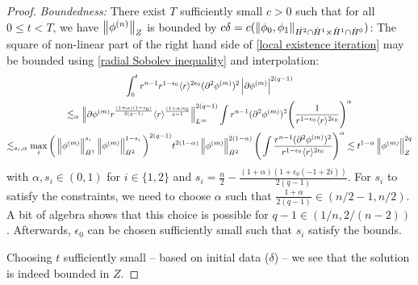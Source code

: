 \documentclass[11pt, oneside]{amsart}
\begin{document}
\begin{proof}
	\textit{Boundedness:} There exist $T$ sufficiently small $c>0$ such that for all $0\leq t<T$, we have $\left\lVert \phi^{(n)}\right\rVert_{Z}$ is bounded by $c\delta=c(\left\lVert \phi_0,\phi_1\right\rVert_{\dot{H^2}\cap\dot{H}^1\times\dot{H}^1\cap\dot{H}^0})$: The square of non-linear part of the right hand side of \eqref{local existence iteration} may be bounded using \cref{radial Sobolev inequality} and interpolation:
	\begin{equation*}
		\begin{gathered}
			\int_0^t r^{n-1}r^{1-\epsilon_0}\langle r \rangle^{2\epsilon_0}(\partial^2\phi^{(m)})^2\left\lvert \partial\phi^{(m)}\right\rvert^{2(q-1)}\\
			\lesssim_{\alpha}\left\lVert \partial\phi^{(m)} r^{\frac{(1+\alpha)(1-\epsilon_0)}{2(q-1)}}\langle r \rangle^{\frac{(1+\alpha)\epsilon_0}{q-1}}\right\rVert_{L^\infty}^{2(q-1)}\int r^{n-1}(\partial^2\phi^{(m)})^2 \Bigg(\frac{1}{r^{1-\epsilon_0}\langle r \rangle^{2\epsilon_0}}\Bigg)^\alpha\\ \lesssim_{s_i,\alpha}\max_i\bigg(\left\lVert \phi^{(m)}\right\rVert_{\dot{H}^1}^{s_i}\left\lVert \phi^{(m)}\right\rVert_{\dot{H}^2}^{1-s_i}\bigg)^{2(q-1)}t^{2(1-\alpha)}\left\lVert \phi^{(m)}\right\rVert_{\dot{H}^2}^{2(1-\alpha)}\Bigg(\int\frac{r^{n-1}(\partial^2\phi^{(m)})^2}{r^{1-\epsilon_0}\langle r \rangle^{2\epsilon_0}}\Bigg)^{\alpha}\lesssim t^{1-\alpha}\left\lVert \phi^{(m)}\right\rVert_Z^{2q}
		\end{gathered}
	\end{equation*}
	with $\alpha,s_i\in(0,1)$ for $i\in\{1,2\}$ and $s_i=\frac{n}{2}-\frac{(1+\alpha)(1+\epsilon_0(-1+2i))}{2(q-1)}$. For $s_i$ to satisfy the constraints,  we need to choose $\alpha$ such that $\frac{1+\alpha}{2(q-1)}\in(n/2-1,n/2)$. A bit of algebra shows that this choice is possible for $q-1\in(1/n,2/(n-2))$. Afterwards, $\epsilon_0$ can be chosen sufficiently small such that $s_i$ satisfy the bounds.	
	
	Choosing $t$ sufficiently small -- based on initial data ($\delta$) -- we see that the solution is indeed bounded in $Z$.
	

\end{proof}
\end{document}
